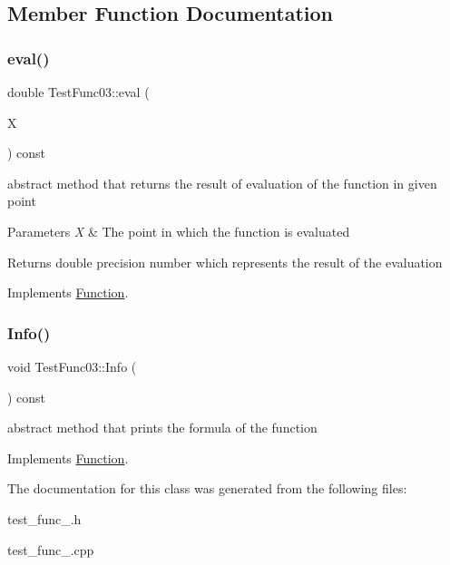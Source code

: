 \subsection{Member Function Documentation}
\mbox{\label{class_test_func03_a76417746f25346a1de704bfcac3eba47}} 
\subsubsection{\texorpdfstring{eval()}{eval()}}
{\footnotesize\ttfamily double Test\+Func03\+::eval (\begin{DoxyParamCaption}\item[{const \hyperlink{classv_point}{v\+Point} \&}]{X }\end{DoxyParamCaption}) const\hspace{0.3cm}{\ttfamily [virtual]}}

abstract method that returns the result of evaluation of the function in given point 
\begin{DoxyParams}{Parameters}
{\em X} & The point in which the function is evaluated \\
\hline
\end{DoxyParams}
\begin{DoxyReturn}{Returns}
double precision number which represents the result of the evaluation 
\end{DoxyReturn}


Implements \hyperlink{class_function_a8b9d55271a531b6f5bef09bfae0a23d9}{Function}.

\mbox{\label{class_test_func03_aab454f96f95f28f7ce1d58736d7fdf86}} 
\subsubsection{\texorpdfstring{Info()}{Info()}}
{\footnotesize\ttfamily void Test\+Func03\+::\+Info (\begin{DoxyParamCaption}{ }\end{DoxyParamCaption}) const\hspace{0.3cm}{\ttfamily [virtual]}}

abstract method that prints the formula of the function 

Implements \hyperlink{class_function_a6915be18a065224ed73b1288c6125948}{Function}.



The documentation for this class was generated from the following files\+:\begin{DoxyCompactItemize}
\item 
test\+\_\+func\+\_.\+h\item 
test\+\_\+func\+\_.\+cpp\end{DoxyCompactItemize}
